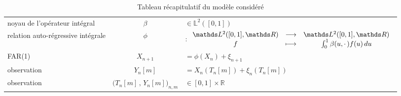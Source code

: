 \begin{table}[H]
\begin{tabularx}{\textwidth}{XcX}
		\midrule
		noyau de l'opérateur intégral                & $\beta$                                     & $\in \mathds L^2([0,1])$                                                                                           \\
		relation auto-régressive intégrale           & $\phi$                                      & $: \func{\mathds L^2([0,1], \mathds R)}{\mathds L^2([0,1], \mathds R)}{f}{\int_0^1 \beta(u, \cdot \, )f(u) \, du}$ \\
		FAR(1)                                       & $X_{n+1}$                                   & $= \phi( X_n )+ \xi_{n+1}$                                                                                         \\
		\midrule
		observation                                  & $Y_n[m]$                                    & $= X_n( T_n[m] ) + \xi_n( T_n[m] )$                                                                                \\
		observation                                  & $\bigl( T_n[m] \, , \, Y_n[m] \bigr)_{n,m}$ & $\in [0,1] \times \mathds R$                                                                                       \\
		\bottomrule
	\end{tabularx}
	\caption{Tableau récapitulatif du modèle considéré}
	\label{tab:model}
\end{table}
